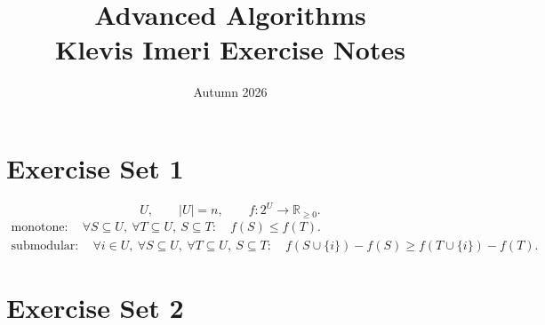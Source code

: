 \documentclass[12pt,a4paper]{article}
\title{Advanced Algorithms\\\large Klevis Imeri Exercise Notes}
\author{}
\date{Autumn 2026}
\begin{document}
\maketitle
\tableofcontents

\section{Exercise Set 1}

\begin{problem}
\[
U,\qquad |U|=n,\qquad f:2^{U}\to\mathbb R_{\geq 0}.
\]
\[
\begin{gathered}
\text{monotone}:\quad
\forall S\subseteq U,\ \forall T\subseteq U,\ S\subseteq T:\quad
f(S)\leq f(T).\\[0.4em]
\text{submodular}:\quad
\forall i\in U,\ \forall S\subseteq U,\ \forall T\subseteq U,\ S\subseteq T:\quad
f(S\cup\{i\})-f(S)\geq f(T\cup\{i\})-f(T).
\end{gathered}
\]
\end{problem}
\begin{solution}
\end{solution}

\begin{problem}
\end{problem}
\begin{solution}
\end{solution}

\begin{problem}
\end{problem}
\begin{solution}
\end{solution}

\section{Exercise Set 2}

\begin{problem}
\end{problem}
\begin{solution}
\end{solution}

\begin{problem}
\end{problem}
\begin{solution}
\end{solution}

\begin{problem}
\end{problem}
\begin{solution}
\end{solution}

\begin{problem}
\end{problem}
\begin{solution}
\end{solution}
\end{document}
